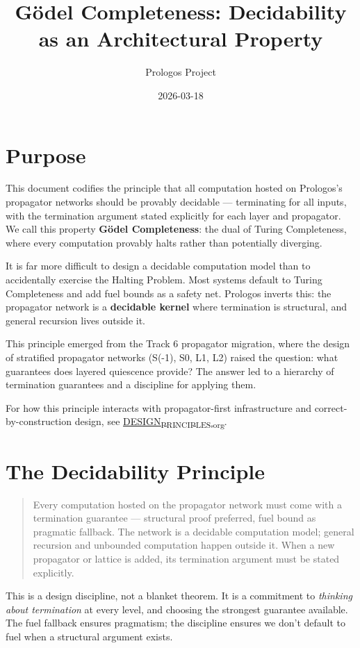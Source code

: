 \documentclass[11pt]{article}
\author{Prologos Project}
\date{2026-03-18}
\title{Gödel Completeness: Decidability as an Architectural Property}
\begin{document}
\maketitle
\tableofcontents

\section{Purpose}
\label{sec:orgc38d131}

This document codifies the principle that all computation hosted on
Prologos's propagator networks should be provably decidable ---
terminating for all inputs, with the termination argument stated
explicitly for each layer and propagator. We call this property
\textbf{Gödel Completeness}: the dual of Turing Completeness, where every
computation provably halts rather than potentially diverging.

It is far more difficult to design a decidable computation model than
to accidentally exercise the Halting Problem. Most systems default to
Turing Completeness and add fuel bounds as a safety net. Prologos
inverts this: the propagator network is a \textbf{decidable kernel} where
termination is structural, and general recursion lives outside it.

This principle emerged from the Track 6 propagator migration, where
the design of stratified propagator networks (S(-1), S0, L1, L2) raised
the question: what guarantees does layered quiescence provide? The
answer led to a hierarchy of termination guarantees and a discipline
for applying them.

For how this principle interacts with propagator-first infrastructure
and correct-by-construction design, see \href{DESIGN\_PRINCIPLES.org}{DESIGN\textsubscript{PRINCIPLES.org}}.
\section{The Decidability Principle}
\label{sec:org52bf8c2}

\begin{quote}
Every computation hosted on the propagator network must come with a
termination guarantee --- structural proof preferred, fuel bound as
pragmatic fallback. The network is a decidable computation model;
general recursion and unbounded computation happen outside it. When a
new propagator or lattice is added, its termination argument must be
stated explicitly.
\end{quote}

This is a design discipline, not a blanket theorem. It is a commitment
to \emph{thinking about termination} at every level, and choosing the
strongest guarantee available. The fuel fallback ensures pragmatism;
the discipline ensures we don't default to fuel when a structural
argument exists.
\end{document}
